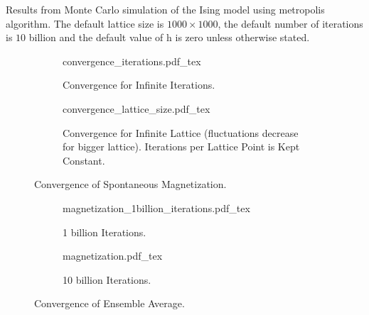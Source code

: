 \documentclass[a4paper, 11pt]{article}
\begin{document}
\vspace*{\fill}
\centering \Large Results from Monte Carlo simulation of the Ising model using metropolis algorithm.
The default lattice size is $1000 \times 1000$, the default number of iterations is
$10$ billion and the default value of h is zero unless otherwise stated.
\vspace*{\fill}
\clearpage

\begin{figure}[t]
	\begin{subfigure}{\textwidth}
		\centering
		\def\svgwidth{\columnwidth}
		{convergence_iterations.pdf_tex}
		\caption{Convergence for Infinite Iterations.}
		\vspace{1.5em}
	\end{subfigure}
	\vfill
	\begin{subfigure}{\textwidth}
		\centering
		\def\svgwidth{\columnwidth}
		{convergence_lattice_size.pdf_tex}
		\caption{\centering Convergence for Infinite Lattice (fluctuations decrease for bigger
		         lattice). Iterations per Lattice Point is Kept Constant.}
		\vspace{1em}
	\end{subfigure}
	\caption{Convergence of Spontaneous Magnetization.}
\end{figure}

\begin{figure}[t]
	\begin{subfigure}{\textwidth}
		\centering
		\def\svgwidth{\columnwidth}
		{magnetization_1billion_iterations.pdf_tex}
		\caption{1 billion Iterations.}
		\vspace{1.5em}
	\end{subfigure}
	\vfill
	\begin{subfigure}{\textwidth}
		\centering
		\def\svgwidth{\columnwidth}
		{magnetization.pdf_tex}
		\caption{10 billion Iterations.}
		\vspace{1em}
	\end{subfigure}
	\caption{Convergence of Ensemble Average.}
\end{figure}
\end{document}
